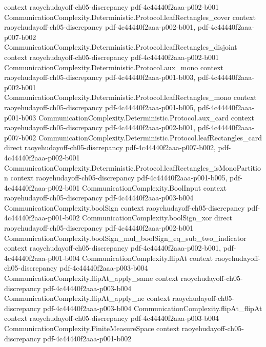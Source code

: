 \begin{theorem}
  {context}
  {raoyehudayoff-ch05-discrepancy}
  {pdf-4c44440f2aaa-p002-b001}
\proofstep
  {CommunicationComplexity.Deterministic.Protocol.leafRectangles_cover}
  {context}
  {raoyehudayoff-ch05-discrepancy}
  {pdf-4c44440f2aaa-p002-b001,
    pdf-4c44440f2aaa-p007-b002}
\proofstep
  {CommunicationComplexity.Deterministic.Protocol.leafRectangles_disjoint}
  {context}
  {raoyehudayoff-ch05-discrepancy}
  {pdf-4c44440f2aaa-p002-b001}
\proofstep
  {CommunicationComplexity.Deterministic.Protocol.aux_mono}
  {context}
  {raoyehudayoff-ch05-discrepancy}
  {pdf-4c44440f2aaa-p001-b003,
    pdf-4c44440f2aaa-p002-b001}
\proofstep
  {CommunicationComplexity.Deterministic.Protocol.leafRectangles_mono}
  {context}
  {raoyehudayoff-ch05-discrepancy}
  {pdf-4c44440f2aaa-p001-b005,
    pdf-4c44440f2aaa-p001-b003}
\proofstep
  {CommunicationComplexity.Deterministic.Protocol.aux_card}
  {context}
  {raoyehudayoff-ch05-discrepancy}
  {pdf-4c44440f2aaa-p002-b001,
    pdf-4c44440f2aaa-p007-b002}
\proofstep
  {CommunicationComplexity.Deterministic.Protocol.leafRectangles_card}
  {direct}
  {raoyehudayoff-ch05-discrepancy}
  {pdf-4c44440f2aaa-p007-b002,
    pdf-4c44440f2aaa-p002-b001}
\proofstep
  {CommunicationComplexity.Deterministic.Protocol.leafRectangles_isMonoPartition}
  {context}
  {raoyehudayoff-ch05-discrepancy}
  {pdf-4c44440f2aaa-p001-b005,
    pdf-4c44440f2aaa-p002-b001}
\proofstep
  {CommunicationComplexity.BoolInput}
  {context}
  {raoyehudayoff-ch05-discrepancy}
  {pdf-4c44440f2aaa-p003-b004}
\proofstep
  {CommunicationComplexity.boolSign}
  {context}
  {raoyehudayoff-ch05-discrepancy}
  {pdf-4c44440f2aaa-p001-b002}
\proofstep
  {CommunicationComplexity.boolSign_xor}
  {direct}
  {raoyehudayoff-ch05-discrepancy}
  {pdf-4c44440f2aaa-p002-b001}
\proofstep
  {CommunicationComplexity.boolSign_mul_boolSign_eq_sub_two_indicator}
  {context}
  {raoyehudayoff-ch05-discrepancy}
  {pdf-4c44440f2aaa-p002-b001,
    pdf-4c44440f2aaa-p001-b004}
\proofstep
  {CommunicationComplexity.flipAt}
  {context}
  {raoyehudayoff-ch05-discrepancy}
  {pdf-4c44440f2aaa-p003-b004}
\proofstep
  {CommunicationComplexity.flipAt_apply_same}
  {context}
  {raoyehudayoff-ch05-discrepancy}
  {pdf-4c44440f2aaa-p003-b004}
\proofstep
  {CommunicationComplexity.flipAt_apply_ne}
  {context}
  {raoyehudayoff-ch05-discrepancy}
  {pdf-4c44440f2aaa-p003-b004}
\proofstep
  {CommunicationComplexity.flipAt_flipAt}
  {context}
  {raoyehudayoff-ch05-discrepancy}
  {pdf-4c44440f2aaa-p003-b004}
\proofstep
  {CommunicationComplexity.FiniteMeasureSpace}
  {context}
  {raoyehudayoff-ch05-discrepancy}
  {pdf-4c44440f2aaa-p001-b002}

\end{theorem}
